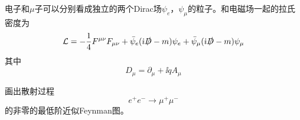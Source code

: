 \documentclass[CJK]{beamer}
\begin{document}
\begin{frame}
\bch
{\small
电子和$\mu$子可以分别看成独立的两个Dirac场$\psi_e$，$\psi_\mu$的粒子。和电磁场一起的拉氏密度为
$${\mathcal{L}} = -\frac{1}{4}{F^{\mu\nu}}{F_{\mu\nu}} + \bar{\psi}_e({\dot{\imath}} \slashed{D} - m)\psi_e + \bar{\psi}_\mu({\dot{\imath}} \slashed{D} - m)\psi_\mu$$
其中
$$ D_\mu = \partial_\mu + \ii q A_\mu$$

画出散射过程
$$e^+e^- \rightarrow \mu^+\mu^-$$
的非零的最低阶近似Feynman图。}
\ech
\end{frame}
\end{document}
